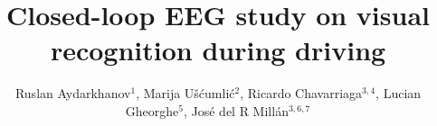 \documentclass[12pt]{iopart}
\begin{document}
\title[]{Closed-loop EEG study on visual recognition during driving}

\author{Ruslan Aydarkhanov$^1$,
Marija U\v{s}\'{c}umli\'{c}$^2$,
Ricardo Chavarriaga$^{3,4}$,
Lucian Gheorghe$^5$,
Jos\'e del R Mill\'an$^{3,6,7}$}


\address{$^1$Medical Image Processing Laboratory,
Center for Neuroprosthetics,
Interschool Institute of Bioengineering,
\'Ecole Polytechnique F\'ed\'erale de Lausanne (EPFL),
Campus Biotech H4,
1202 Geneva,
Switzerland}
\address{$^2$Nissan International SA,
La Pi\`ece 12,
1180 Rolle,
Switzerland
}

\address{$^3$\'Ecole Polytechnique F\'ed\'erale de Lausanne (EPFL),
Campus Biotech H4,
1202 Geneva,
 Switzerland}

\address{$^4$ZHAW Datalab, Zurich University of Applied Sciences, Winterthur, Switzerland
 }

\address{$^5$
Advanced Materials and Processing Laboratory, Nissan Research Center, Nissan Motors Co. LTD, 1,
Natsushima, Yokosuka-shi, Kanagawa-ken, 237-8523, Japan
}
\address{$^6$Dept. of Electrical and Computer Engineering,
The University of Texas at Austin,
Austin, TX 78712,
USA}
\address{$^7$Dept. of Neurology,
The University of Texas at Austin,
Austin, TX 78712,
USA}
\vspace{10pt}
\end{document}
